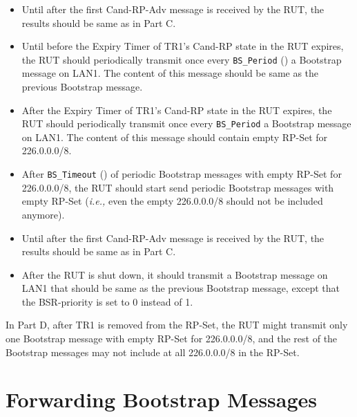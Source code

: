 \documentclass[11pt]{report}
\newcommand{\ie}{\emph{i.e.,}\xspace}
\begin{document}
\begin{itemize}

  \item Until after the first Cand-RP-Adv message is received by the RUT, the
  results should be same as in Part C.

  \item Until before the Expiry Timer of TR1's Cand-RP state in the RUT
  expires, the RUT should periodically transmit once every
  \verb=BS_Period= ({\PimsmBSPeriod}) a Bootstrap message on LAN1. The content
  of this message should be same as the previous Bootstrap message.

  \item After the Expiry Timer of TR1's Cand-RP state in the RUT
  expires, the RUT should periodically transmit once every
  \verb=BS_Period= {\PimsmBSPeriod} a Bootstrap message on LAN1. The content
  of this message should contain empty RP-Set for 226.0.0.0/8.

  \item After \verb=BS_Timeout= ({\PimsmBSTimeout}) of periodic Bootstrap
  messages with empty RP-Set for 226.0.0.0/8, the RUT should start send
  periodic Bootstrap messages with empty RP-Set (\ie even the empty
  226.0.0.0/8 should not be included anymore).

\end{itemize}


\begin{itemize}

  \item Until after the first Cand-RP-Adv message is received by the RUT, the
  results should be same as in Part C.

  \item After the RUT is shut down, it should transmit a Bootstrap message on
  LAN1 that should be same as the previous Bootstrap message, except that the
  BSR-priority is set to 0 instead of 1.

\end{itemize}

In Part D, after TR1 is removed from the RP-Set, the RUT might transmit only
one Bootstrap message with empty RP-Set for 226.0.0.0/8, and the rest of the
Bootstrap messages may not include at all 226.0.0.0/8 in the RP-Set.


\newpage
\section{Forwarding Bootstrap Messages}
\end{document}
